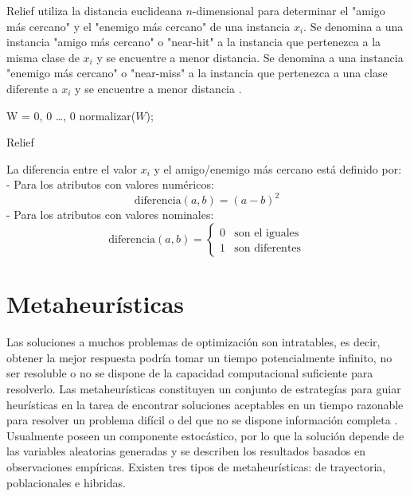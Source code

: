 \documentclass{ci5652}
\begin{document}
Relief utiliza la distancia euclideana $n$-dimensional para determinar el "amigo
más cercano" y el "enemigo más cercano" de una instancia $x_i$. Se denomina a
una instancia "amigo más cercano" o "near-hit" a la instancia que pertenezca a
la misma clase de $x_i$ y se encuentre a menor distancia. Se denomina a una
instancia "enemigo más cercano" o "near-miss" a la instancia que pertenezca a
una clase diferente a $x_i$ y se encuentre a menor distancia \cite{Kira_1992}.

\begin{algorithm}
 \DontPrintSemicolon
 \vspace*{0.1cm}
  W = {0, 0 \dots, 0}\;
  normalizar($W$);\;
 \vspace*{0.1cm}
 \caption{Relief}
\end{algorithm}

La diferencia entre el valor $x_i$ y el amigo/enemigo más cercano está definido
por: \\
- Para los atributos con valores numéricos:
$$\text{diferencia}(a,b) = {(a - b)}^{2}$$
- Para los atributos con valores nominales:
\[
\text{diferencia}(a,b) =
  \begin{cases}
    0 & \text{son el iguales}\\
    1 & \text{son diferentes}
  \end{cases}
\]

\section{Metaheurísticas}

Las soluciones a muchos problemas de optimización son intratables, es decir,
obtener la mejor respuesta podría tomar un tiempo potencialmente infinito, no
ser resoluble o no se dispone de la capacidad computacional suficiente para
resolverlo. Las metaheurísticas constituyen un conjunto de estrategías para
guiar heurísticas en la tarea de encontrar soluciones aceptables en un tiempo
razonable para resolver un problema difícil o del que no se dispone información
completa \cite{Talbi_2009}. Usualmente poseen un componente estocástico, por lo
que la solución depende de las variables aleatorias generadas y se describen los
resultados basados en observaciones empíricas. Existen tres tipos de
metaheurísticas: de trayectoria, poblacionales e hibridas.\\
\end{document}

